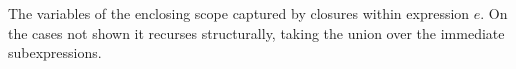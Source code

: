 The variables of the enclosing scope captured by closures within expression $e$. On the cases not shown it
recurses structurally, taking the union over the immediate subexpressions.
